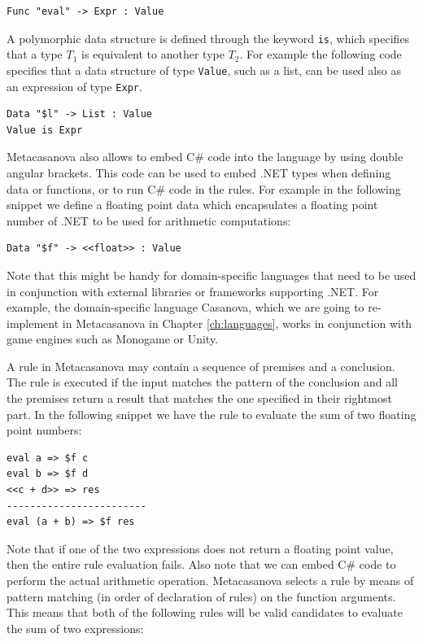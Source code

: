 \begin{lstlisting}
Func "eval" -> Expr : Value
\end{lstlisting}

\noindent
A polymorphic data structure is defined through the keyword \texttt{is}, which specifies that a type $T_1$ is equivalent to another type $T_2$. For example the following code specifies that a data structure of type \texttt{Value}, such as a list, can be used also as an expression of type \texttt{Expr}.

\begin{lstlisting}
Data "$l" -> List : Value 
Value is Expr
\end{lstlisting}

Metacasanova also allows to embed C\# code into the language by using double angular brackets. This code can be used to embed .NET types when defining data or functions, or to run C\# code in the rules. For example in the following snippet we define a floating point data which encapsulates a floating point number of .NET to be used for arithmetic computations:

\begin{lstlisting}
Data "$f" -> <<float>> : Value
\end{lstlisting}

\noindent
Note that this might be handy for domain-specific languages that need to be used in conjunction with external libraries or frameworks supporting .NET. For example, the domain-specific language Casanova, which we are going to re-implement in Metacasanova in Chapter \ref{ch:languages}, works in conjunction with game engines such as Monogame or Unity.

A rule in Metacasanova may contain a sequence of premises and a conclusion. The rule is executed if the input matches the pattern of the conclusion and all the premises return a result that matches the one specified in their rightmost part. In the following snippet we have the rule to evaluate the sum of two floating point numbers:

\begin{lstlisting}
eval a => $f c
eval b => $f d
<<c + d>> => res
------------------------
eval (a + b) => $f res
\end{lstlisting}

\noindent
Note that if one of the two expressions does not return a floating point value, then the entire rule evaluation fails. Also note that we can embed C\# code to perform the actual arithmetic operation. Metacasanova selects a rule by means of pattern matching (in order of declaration of rules) on the function arguments. This means that both of the following rules will be valid candidates to evaluate the sum of two expressions:

